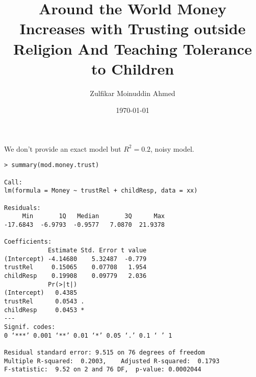 \documentclass{amsart}
\title{Around the World Money Increases with Trusting outside Religion And Teaching Tolerance to Children}
\author{Zulfikar Moinuddin Ahmed}
\date{\today}
\begin{document}
\maketitle

We don't provide an exact model but $R^2=0.2$, noisy model.

\begin{verbatim}
> summary(mod.money.trust)

Call:
lm(formula = Money ~ trustRel + childResp, data = xx)

Residuals:
     Min       1Q   Median       3Q      Max 
-17.6843  -6.9793  -0.9577   7.0870  21.9378 

Coefficients:
            Estimate Std. Error t value
(Intercept) -4.14680    5.32487  -0.779
trustRel     0.15065    0.07708   1.954
childResp    0.19908    0.09779   2.036
            Pr(>|t|)  
(Intercept)   0.4385  
trustRel      0.0543 .
childResp     0.0453 *
---
Signif. codes:  
0 ‘***’ 0.001 ‘**’ 0.01 ‘*’ 0.05 ‘.’ 0.1 ‘ ’ 1

Residual standard error: 9.515 on 76 degrees of freedom
Multiple R-squared:  0.2003,	Adjusted R-squared:  0.1793 
F-statistic:  9.52 on 2 and 76 DF,  p-value: 0.0002044
\end{verbatim}
\end{document}
